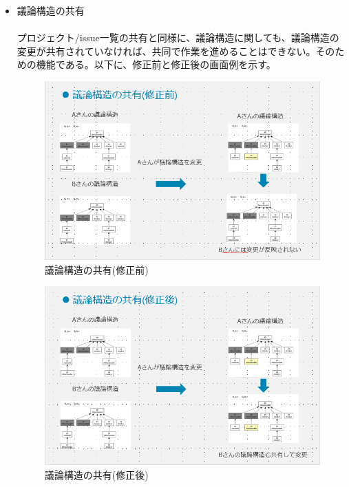 \documentclass[12pt, oneside]{jreport}
\begin{document}
\begin{itemize}
		
			\item 議論構造の共有
			\\ \\
			プロジェクト/issue一覧の共有と同様に、議論構造に関しても、議論構造の変更が共有されていなければ、共同で作業を進めることはできない。そのための機能である。以下に、修正前と修正後の画面例を示す。
			
			\begin{figure}[H]
			\centering
			\includegraphics[width=17cm,bb=200 300 -200 27]{graphedit_before.PNG}
			\caption{議論構造の共有(修正前)}
			\end{figure}
						\begin{figure}[H]
			\centering
			\includegraphics[width=17cm,bb=200 300 -200 27]{graphedit_after.PNG}
			\caption{議論構造の共有(修正後)}
			\end{figure}
			
		\end{itemize}
		
\end{document}
